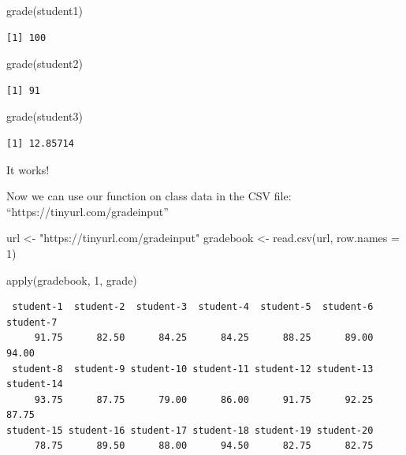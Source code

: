 \documentclass[
  letterpaper,
  DIV=11,
  numbers=noendperiod]{scrartcl}
\newenvironment{Shaded}{\begin{snugshade}}{\end{snugshade}}
\newcommand{\AttributeTok}[1]{\textcolor[rgb]{0.40,0.45,0.13}{#1}}
\newcommand{\DecValTok}[1]{\textcolor[rgb]{0.68,0.00,0.00}{#1}}
\newcommand{\FunctionTok}[1]{\textcolor[rgb]{0.28,0.35,0.67}{#1}}
\newcommand{\NormalTok}[1]{\textcolor[rgb]{0.00,0.23,0.31}{#1}}
\newcommand{\OtherTok}[1]{\textcolor[rgb]{0.00,0.23,0.31}{#1}}
\newcommand{\StringTok}[1]{\textcolor[rgb]{0.13,0.47,0.30}{#1}}
\begin{document}
\begin{Shaded}
\begin{Highlighting}[]
\FunctionTok{grade}\NormalTok{(student1)}
\end{Highlighting}
\end{Shaded}

\begin{verbatim}
[1] 100
\end{verbatim}

\begin{Shaded}
\begin{Highlighting}[]
\FunctionTok{grade}\NormalTok{(student2)}
\end{Highlighting}
\end{Shaded}

\begin{verbatim}
[1] 91
\end{verbatim}

\begin{Shaded}
\begin{Highlighting}[]
\FunctionTok{grade}\NormalTok{(student3)}
\end{Highlighting}
\end{Shaded}

\begin{verbatim}
[1] 12.85714
\end{verbatim}

It works!

Now we can use our function on class data in the CSV file:
``https://tinyurl.com/gradeinput''

\begin{Shaded}
\begin{Highlighting}[]
\NormalTok{url }\OtherTok{\textless{}{-}} \StringTok{"https://tinyurl.com/gradeinput"}
\NormalTok{gradebook }\OtherTok{\textless{}{-}} \FunctionTok{read.csv}\NormalTok{(url, }\AttributeTok{row.names =} \DecValTok{1}\NormalTok{)}
\end{Highlighting}
\end{Shaded}

\begin{Shaded}
\begin{Highlighting}[]
\FunctionTok{apply}\NormalTok{(gradebook, }\DecValTok{1}\NormalTok{, grade)}
\end{Highlighting}
\end{Shaded}

\begin{verbatim}
 student-1  student-2  student-3  student-4  student-5  student-6  student-7 
     91.75      82.50      84.25      84.25      88.25      89.00      94.00 
 student-8  student-9 student-10 student-11 student-12 student-13 student-14 
     93.75      87.75      79.00      86.00      91.75      92.25      87.75 
student-15 student-16 student-17 student-18 student-19 student-20 
     78.75      89.50      88.00      94.50      82.75      82.75 
\end{verbatim}
\end{document}
